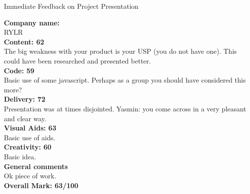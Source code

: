 \documentclass{article}
\begin{document}
\begin{center}
\Huge{Immediate Feedback on Project Presentation}\\
\end{center}


\normalsize
\textbf{Company name:}\\

RYLR \\

\textbf{Content: 62}\\

The big weakness with your product is your USP (you do not have one).
This could have been researched and presented better.\\

\textbf{Code: 59}\\

Basic use of some javascript.
Perhaps as a group you should have considered this more?\\

\textbf{Delivery: 72}\\

Presentation was at times disjointed.
Yasmin: you come across in a very pleasant and clear way.\\

\textbf{Visual Aids: 63}\\

Basic use of aids.\\

\textbf{Creativity: 60}\\

Basic idea.\\

\textbf{General comments}\\

Ok piece of work.\\

\textbf{Overall Mark: 63/100}
\end{document}
